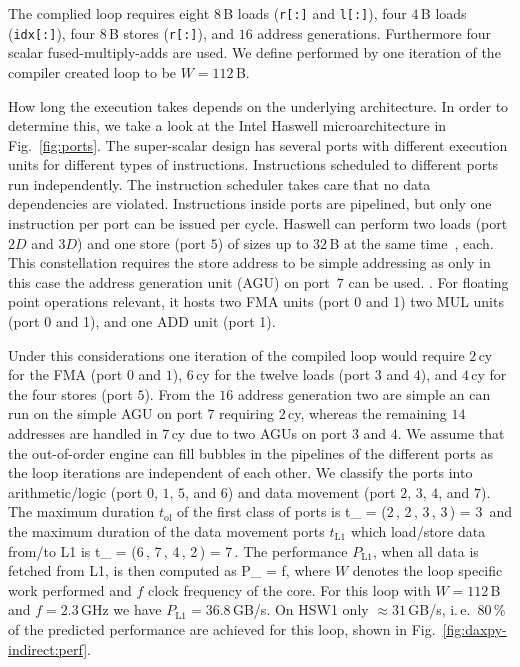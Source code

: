 The complied loop requires eight $8$\,B loads (\verb|r[:]| and
\verb|l[:]|), four $4$\,B loads (\verb'idx[:]'), four
$8$\,B stores (\verb'r[:]'), and $16$ address generations.
Furthermore four scalar fused-multiply-adds are used. 
We define performed by one iteration of the compiler created loop to be $W =
112$\,B.

How long the execution takes depends on the underlying architecture. 
In order to determine this, we take a look at the Intel Haswell
microarchitecture in Fig.~\ref{fig:ports}.
The super-scalar design has several ports with different execution units for
different types of instructions.
Instructions scheduled to different ports run independently.
The instruction scheduler takes care that no data dependencies are violated.
Instructions inside ports are pipelined, but only one instruction per port can
be issued per cycle.
Haswell can perform two loads (port $2D$ and $3D$) and one store (port $5$) of
sizes up to $32$\,B at the same time~\cite{agner-2016-11-3}, each.
This constellation requires the store address to be simple addressing as only in
this case the address generation unit (AGU) on port~$7$ can be used.
. 
%
For floating point operations relevant, it hosts two FMA units (port 0 and
1) two MUL units (port 0 and 1), and one ADD unit (port 1).

Under this considerations one iteration of the compiled loop would require $2$\,cy
for the FMA (port $0$ and $1$), $6$\,cy for the twelve loads (port $3$ and $4$),
and $4$\,cy for the four stores (port $5$).
From the $16$ address generation two are simple an can run on the simple AGU on
port $7$ requiring $2$\,cy, whereas the remaining $14$ addresses are handled in
$7$\,cy due to two AGUs on port $3$ and $4$.
We assume that the out-of-order engine can fill bubbles in the pipelines of the
different ports as the loop iterations are independent of each other.
We classify the ports into arithmetic/logic (port $0$, $1$, $5$, and $6$) and
data movement (port $2$, $3$, $4$, and $7$). 
The maximum duration $t_\text{ol}$ of the first class of ports is 
%
\be
  t_ = \max(2\,\cyw, 2\,\cyw, 3\,\cyw, 3\,\cyw)
= 3\,\cyw
\ee
%
and the maximum duration of the data movement ports $t_\text{L1}$ which
load/store data from/to L1 is
\be
  t_ = \max(6\,\cyw, 7\,\cyw, 4\,\cyw, 2\,\cyw) =
7\,\cyw.
\ee
%
%
The performance $P_\text{L1}$, when all data is fetched from L1, is then computed as 
%
\be
  P_ =  f,
\ee
%
where $W$ denotes the loop specific work performed and $f$ clock frequency of the core.
For this loop with $W=112$\,B and $f=2.3$\,GHz we have $P_\text{L1} =
36.8$\,GB/s. On HSW1 only $\approx 31$\,GB/s, i.\,e.\ 80\,\% of the predicted
performance are achieved for this loop, shown in Fig.~\ref{fig:daxpy-indirect:perf}.

